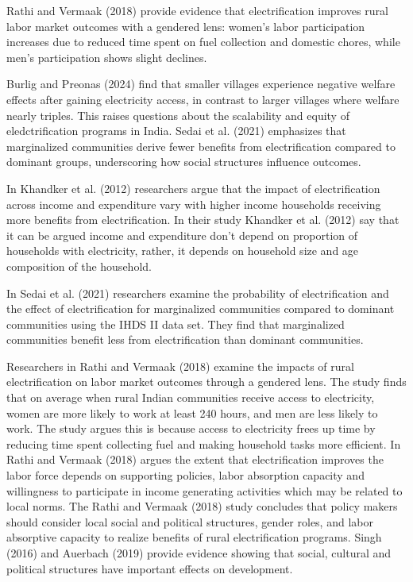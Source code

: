 \documentclass[
]{article}
\begin{document}
Rathi and Vermaak (2018) provide evidence that electrification improves
rural labor market outcomes with a gendered lens: women's labor
participation increases due to reduced time spent on fuel collection and
domestic chores, while men's participation shows slight declines.

Burlig and Preonas (2024) find that smaller villages experience negative
welfare effects after gaining electricity access, in contrast to larger
villages where welfare nearly triples. This raises questions about the
scalability and equity of eledctrification programs in India. Sedai et
al. (2021) emphasizes that marginalized communities derive fewer
benefits from electrification compared to dominant groups, underscoring
how social structures influence outcomes.

In Khandker et al. (2012) researchers argue that the impact of
electrification across income and expenditure vary with higher income
households receiving more benefits from electrification. In their study
Khandker et al. (2012) say that it can be argued income and expenditure
don't depend on proportion of households with electricity, rather, it
depends on household size and age composition of the household.

In Sedai et al. (2021) researchers examine the probability of
electrification and the effect of electrification for marginalized
communities compared to dominant communities using the IHDS II data set.
They find that marginalized communities benefit less from
electrification than dominant communities.

Researchers in Rathi and Vermaak (2018) examine the impacts of rural
electrification on labor market outcomes through a gendered lens. The
study finds that on average when rural Indian communities receive access
to electricity, women are more likely to work at least 240 hours, and
men are less likely to work. The study argues this is because access to
electricity frees up time by reducing time spent collecting fuel and
making household tasks more efficient. In Rathi and Vermaak (2018)
argues the extent that electrification improves the labor force depends
on supporting policies, labor absorption capacity and willingness to
participate in income generating activities which may be related to
local norms. The Rathi and Vermaak (2018) study concludes that policy
makers should consider local social and political structures, gender
roles, and labor absorptive capacity to realize benefits of rural
electrification programs. Singh (2016) and Auerbach (2019) provide
evidence showing that social, cultural and political structures have
important effects on development.
\end{document}
